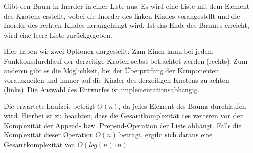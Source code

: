 \documentclass[11pt]{article}
\begin{document}
    Gibt den Baum in Inorder in einer Liste aus.
    Es wird eine Liste mit dem Element des Knotens erstellt,
    wobei die Inorder des linken Kindes vorangestellt und die
    Inorder des rechten Kindes herangehängt wird.
    Ist das Ende des Baumes erreicht, wird eine leere Liste zurückgegeben.

    Hier haben wir zwei Optionen dargestellt: Zum Einen kann bei jedem
    Funktionsdurchlauf der derzeitige Knoten selbst betrachtet werden (rechts).
    Zum anderen gibt es die Möglichkeit, bei der Überprüfung der Komponenten
    vorauszueilen und immer auf die Kinder des derzeitigen Knotens zu achten (links).
    Die Auswahl des Entwurfes ist implementationsabhängig.

    Die erwartete Laufzeit beträgt
    \begin{math}
        \Theta (n)
    \end{math},
    da jedes Element des Baums durchlaufen wird.
    Hierbei ist zu beachten, dass die Gesamtkomplexität des weiteren von der
    Komplexität der Append- bzw. Prepend-Operation der Liste abhängt.
    Falls die Komplexität dieser Operation
    \begin{math}
        O(n)
    \end{math}
    beträgt, ergibt sich daraus eine Gesamtkomplexität von
    \begin{math}
        O(log(n) \cdot n)
    \end{math}
\end{document}
